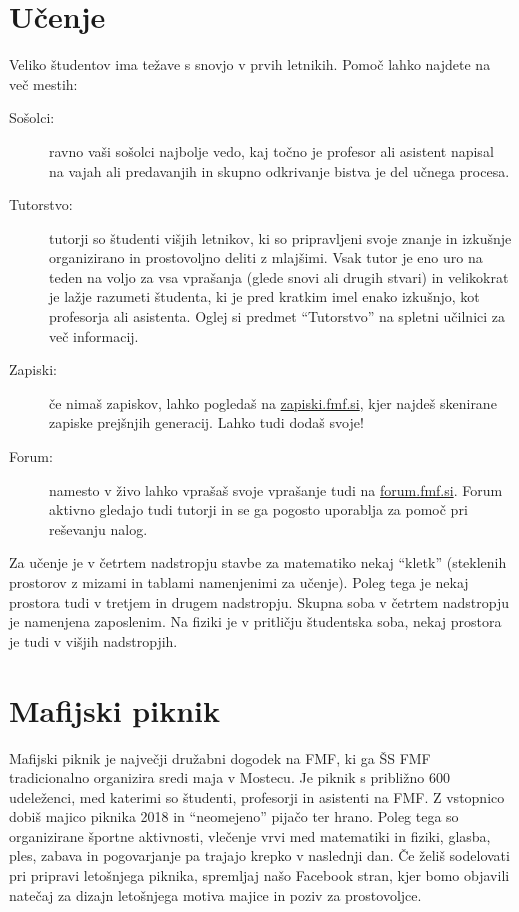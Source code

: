 \documentclass[a4paper,notumble]{leaflet} %
\begin{document}
  \section{Učenje}
  Veliko študentov ima težave s snovjo
  v prvih letnikih. Pomoč lahko najdete na več mestih:
  \begin{description}
    \item[Sošolci:] ravno vaši sošolci najbolje vedo,
    kaj točno je profesor ali asistent napisal na vajah
    ali predavanjih in skupno odkrivanje bistva je del učnega procesa.
    \item[Tutorstvo:] tutorji so študenti višjih letnikov, ki so pripravljeni svoje znanje in izkušnje organizirano in prostovoljno deliti z mlajšimi. Vsak tutor je eno uro na teden na voljo za vsa vprašanja (glede snovi ali drugih stvari) in velikokrat je lažje razumeti študenta, ki je pred kratkim imel enako izkušnjo, kot profesorja ali asistenta.
    Oglej si predmet ``Tutorstvo'' na spletni učilnici za več informacij.
    \item[Zapiski:] če nimaš zapiskov, lahko pogledaš na \url{zapiski.fmf.si}, kjer najdeš skenirane zapiske prejšnjih generacij. Lahko tudi dodaš svoje!
    \item[Forum:] namesto v živo lahko vprašaš svoje vprašanje tudi na \url{forum.fmf.si}. Forum aktivno gledajo tudi tutorji in se ga pogosto uporablja za pomoč pri reševanju nalog.
  \end{description}
  Za učenje je v četrtem nadstropju stavbe za matematiko nekaj ``kletk'' (steklenih prostorov
    z mizami in tablami namenjenimi za učenje). Poleg tega je nekaj prostora tudi v tretjem in drugem nadstropju. Skupna soba v četrtem nadstropju je namenjena zaposlenim. Na fiziki je v pritličju študentska soba, nekaj prostora je tudi v višjih nadstropjih.

  \section{Mafijski piknik}
  Mafijski piknik je največji družabni dogodek na FMF, ki ga ŠS FMF tradicionalno organizira sredi maja v Mostecu.
  Je piknik s približno 600 udeleženci, med katerimi so študenti, profesorji in asistenti na FMF. Z vstopnico dobiš
  majico piknika 2018 in ``neomejeno'' pijačo ter hrano.
  Poleg tega so organizirane športne aktivnosti, vlečenje
  vrvi med matematiki in fiziki, glasba, ples, zabava in pogovarjanje pa trajajo krepko v naslednji dan.
  Če želiš sodelovati pri pripravi letošnjega piknika, spremljaj našo Facebook stran, kjer bomo objavili natečaj za dizajn letošnjega motiva majice in poziv za prostovoljce.
\end{document}
